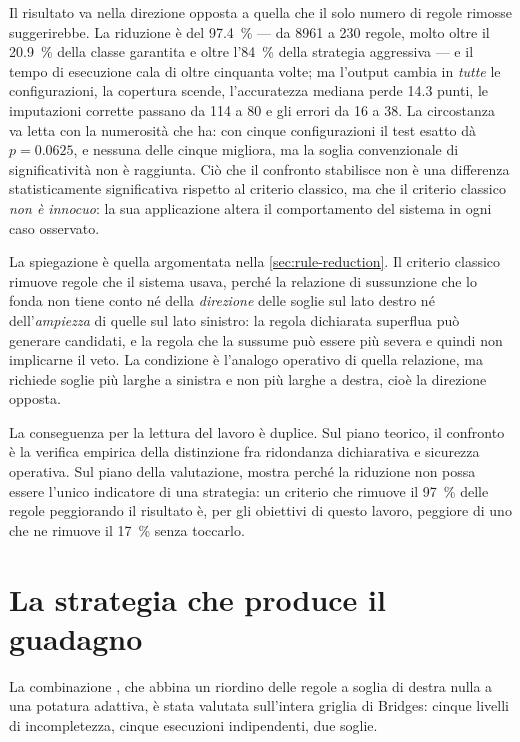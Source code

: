 Il risultato va nella direzione opposta a quella che il solo numero di regole rimosse
suggerirebbe. La riduzione è del \SI{97.4}{\percent} --- da \num{8961} a \num{230} regole, molto
oltre il \SI{20.9}{\percent} della classe garantita e oltre l'\SI{84}{\percent} della strategia
aggressiva --- e il tempo di esecuzione cala di oltre cinquanta volte; ma l'output cambia in
\emph{tutte} le configurazioni, la copertura scende, l'accuratezza mediana perde \num{14.3} punti,
le imputazioni corrette passano da \num{114} a \num{80} e gli errori da \num{16} a \num{38}. La
circostanza va letta con la numerosità che ha: con cinque configurazioni il test esatto dà
$p = \num{0.0625}$, e nessuna delle cinque migliora, ma la soglia convenzionale di significatività
non è raggiunta. Ciò che il confronto stabilisce non è una differenza statisticamente significativa
rispetto al criterio classico, ma che il criterio classico \emph{non è innocuo}: la sua applicazione
altera il comportamento del sistema in ogni caso osservato.

La spiegazione è quella argomentata nella \autoref{sec:rule-reduction}. Il criterio classico
rimuove regole che il sistema usava, perché la relazione di sussunzione che lo fonda non tiene
conto né della \emph{direzione} delle soglie sul lato destro né dell'\emph{ampiezza} di quelle sul
lato sinistro: la regola dichiarata superflua può generare candidati, e la regola che la sussume
può essere più severa e quindi non implicarne il veto. La condizione \Vtwo{} è l'analogo operativo
di quella relazione, ma richiede soglie più larghe a sinistra e non più larghe a destra, cioè la
direzione opposta.

La conseguenza per la lettura del lavoro è duplice. Sul piano teorico, il confronto è la verifica
empirica della distinzione fra ridondanza dichiarativa e sicurezza operativa. Sul piano della
valutazione, mostra perché la riduzione non possa essere l'unico indicatore di una strategia: un
criterio che rimuove il \SI{97}{\percent} delle regole peggiorando il risultato è, per gli
obiettivi di questo lavoro, peggiore di uno che ne rimuove il \SI{17}{\percent} senza toccarlo.

\section{La strategia che produce il guadagno}\label{sec:res-a5b}

La combinazione , che abbina un riordino delle regole a soglia di destra nulla a una
potatura adattiva, è stata valutata sull'intera griglia di Bridges: cinque livelli di
incompletezza, cinque esecuzioni indipendenti, due soglie.

